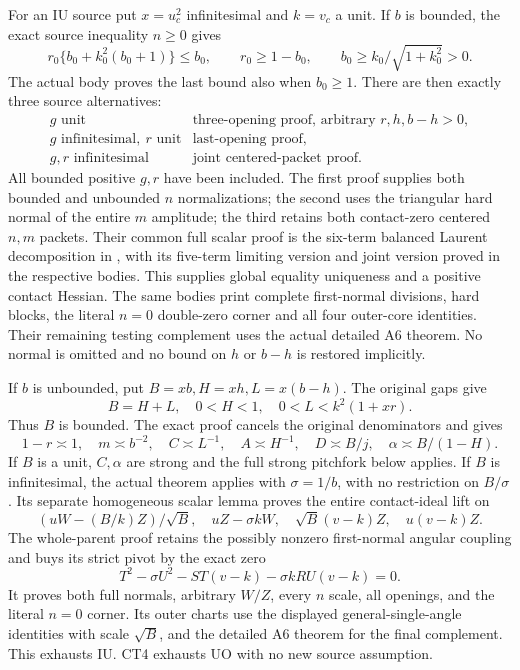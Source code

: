For an IU source put \(x=u_c^2\) infinitesimal and
\(k=v_c\) a unit.  If \(b\) is bounded, the exact source
inequality \(n\geq0\) gives
\[
 r_0\{b_0+k_0^2(b_0+1)\}\leq b_0,\qquad
 r_0\geq1-b_0,\qquad
 b_0\geq k_0/\sqrt{1+k_0^2}>0 .                       \tag{CT10}
\]
The actual body  proves
the last bound also when \(b_0\geq1\).
There are then exactly three source alternatives:
\[
\begin{array}{c|l}
g\text{ unit}&\text{three-opening proof, arbitrary }r,h,b-h>0,\\
g\text{ infinitesimal},\ r\text{ unit}
             &\text{last-opening proof},\\
g,r\text{ infinitesimal}
             &\text{joint centered-packet proof}.
\end{array}\tag{CT11}
\]
All bounded positive \(g,r\) have been included.
The first proof supplies both bounded and unbounded \(n\)
normalizations; the second uses the triangular hard normal of
the entire \(m\) amplitude; the third retains both contact-zero
centered \(n,m\) packets.  Their common full scalar proof is the
six-term balanced Laurent decomposition in
, with its five-term limiting
version and joint version proved in the respective bodies.
This supplies global equality uniqueness and a positive contact
Hessian.  The same bodies print complete first-normal divisions,
hard blocks, the literal \(n=0\) double-zero corner and all four
outer-core identities.  Their remaining testing complement uses
the actual detailed A6 theorem.  No normal is omitted and no
bound on \(h\) or \(b-h\) is restored implicitly.

If \(b\) is unbounded, put \(B=xb,H=xh,L=x(b-h)\).
The original gaps give
\[
 B=H+L,\quad 0<H<1,\quad 0<L<k^2(1+xr).
\]
Thus \(B\) is bounded.  The exact proof
 cancels the original
denominators and gives
\[
 1-r\asymp1,\quad m\asymp b^{-2},\quad
 C\asymp L^{-1},\quad A\asymp H^{-1},\quad
 D\asymp B/j,\quad \alpha\asymp B/(1-H).               \tag{CT12}
\]
If \(B\) is a unit, \(C,\alpha\) are strong and the full strong
pitchfork below applies.  If \(B\) is infinitesimal, the actual
 theorem applies with
\(\sigma=1/b\), with no restriction on \(B/\sigma\).
Its separate homogeneous scalar lemma proves the entire
contact-ideal lift on
\[
 (uW-(B/k)Z)/\sqrt B,\quad uZ-\sigma kW,\quad
 \sqrt B(v-k)Z,\quad u(v-k)Z .
\tag{CT13}
\]
The whole-parent proof retains the possibly nonzero first-normal
angular coupling and buys its strict pivot by the exact zero
\[
 T^2-\sigma U^2-ST(v-k)-\sigma kRU(v-k)=0 .
\]
It proves both full normals, arbitrary \(W/Z\), every \(n\) scale,
all openings, and the literal \(n=0\) corner.  Its outer charts
use the displayed general-single-angle identities with scale
\(\sqrt B\), and the detailed A6 theorem for the final complement.
This exhausts IU.  CT4 exhausts UO with no new source assumption.

